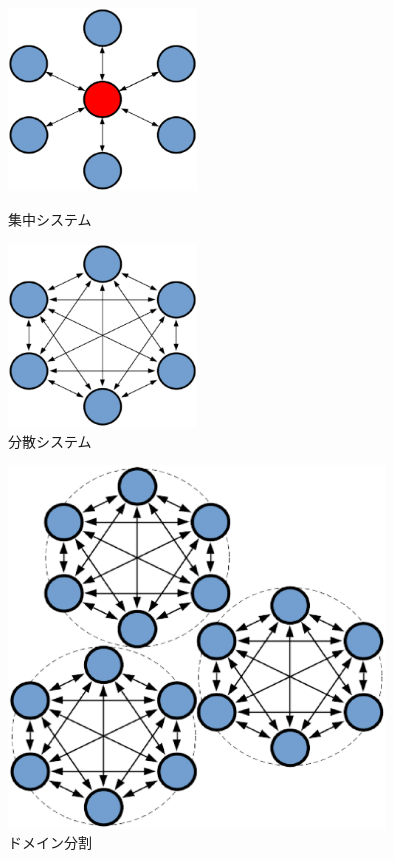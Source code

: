 \documentclass[a4paper,12pt]{jsarticle}
\begin{document}
\begin{figure}[h]%
  \begin{minipage}{0.5\columnwidth}
    \centering
    \includegraphics[width=50mm]{pht/CentralizedSystem.eps}
    \caption{集中システム}
    \label{fig:CentralizedSystem}
  \end{minipage}
  \begin{minipage}{0.5\columnwidth}
    \centering
    \includegraphics[width=50mm]{pht/DistributedSystem.eps}
    \caption{分散システム}
    \label{fig:DistributedSystem}
  \end{minipage}
\end{figure}

\begin{figure}[h]%
  \begin{center}
    \includegraphics[width=100mm]{pht/DomainSplit.eps}
  \end{center}
  \caption{ドメイン分割}
  \label{fig:DomainSplit}
\end{figure}
\end{document}
